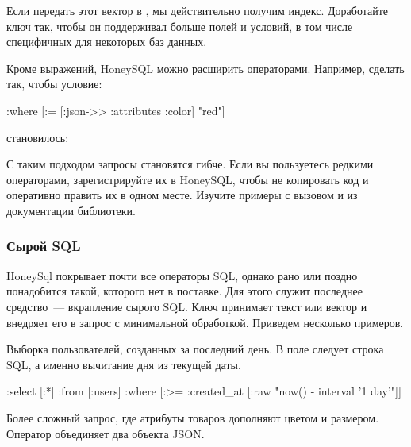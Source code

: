 Если передать этот вектор в , мы действительно получим индекс. Доработайте ключ  так, чтобы он поддерживал больше полей и условий, в том числе специфичных для некоторых баз данных.

Кроме выражений, HoneySQL можно расширить операторами. Например, сделать так, чтобы условие:

\begin{english}
  \begin{clojure}
{:where [:= [:json->> :attributes :color] "red"]}
  \end{clojure}
\end{english}

становилось:

\begin{english}
  \begin{clojure}
["... WHERE attributes ->> 'color' = ?" "red"]
  \end{clojure}
\end{english}

С таким подходом запросы становятся гибче. Если вы пользуетесь редкими операторами, зарегистрируйте их в HoneySQL, чтобы не копировать код и оперативно править их в одном месте. Изучите примеры с вызовом  и  из документации библиотеки.

\subsubsection{Сырой SQL}

HoneySql покрывает почти все операторы SQL, однако рано или поздно понадобится такой, которого нет в поставке. Для этого служит последнее средство~--- вкрапление сырого SQL. Ключ  принимает текст или вектор и внедряет его в запрос с минимальной обработкой. Приведем несколько примеров.

Выборка пользователей, созданных за последний день. В поле  следует строка SQL, а именно вычитание дня из текущей даты.

\begin{english}
  \begin{clojure}
{:select [:*]
 :from [:users]
 :where [:>= :created_at [:raw "now() - interval '1 day'"]]}
  \end{clojure}
\end{english}

Более сложный запрос, где атрибуты товаров дополняют цветом и размером. Оператор \code{||} объединяет два объекта JSON.

